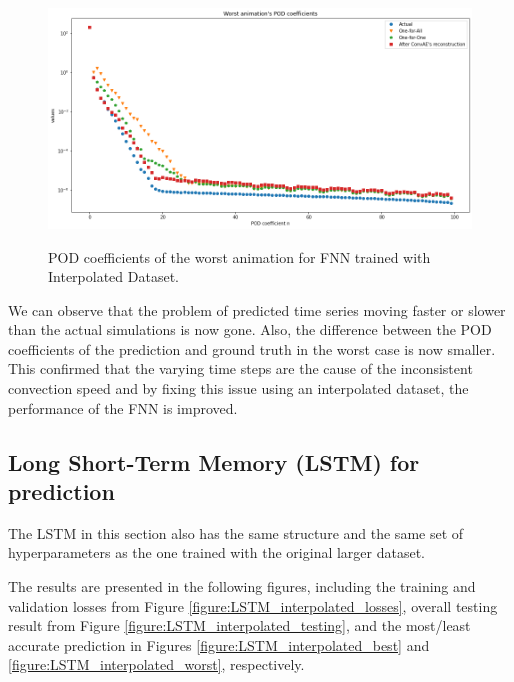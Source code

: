 \begin{figure}[H]
    \centering
    \caption{POD coefficients of the worst animation for FNN trained with Interpolated Dataset.}
    \includegraphics[scale=0.4]{figures/mantle_convection_images/larger_dataset_interpolated/FNN_Worst_POD.png}
    \label{figure:FNN_interpolated_worst_POD}
\end{figure}

We can observe that the problem of predicted time series moving faster or slower than the actual simulations is now gone. Also, the difference between the POD coefficients of the prediction and ground truth in the worst case is now smaller. This confirmed that the varying time steps are the cause of the inconsistent convection speed and by fixing this issue using an interpolated dataset, the performance of the FNN is improved.


\subsection{Long Short-Term Memory (LSTM) for prediction}

The LSTM in this section also has the same structure and the same set of hyperparameters as the one trained with the original larger dataset.

The results are presented in the following figures, including the training and validation losses from Figure \ref{figure:LSTM_interpolated_losses}, overall testing result from Figure \ref{figure:LSTM_interpolated_testing}, and the most/least accurate prediction in Figures \ref{figure:LSTM_interpolated_best} and \ref{figure:LSTM_interpolated_worst}, respectively.


